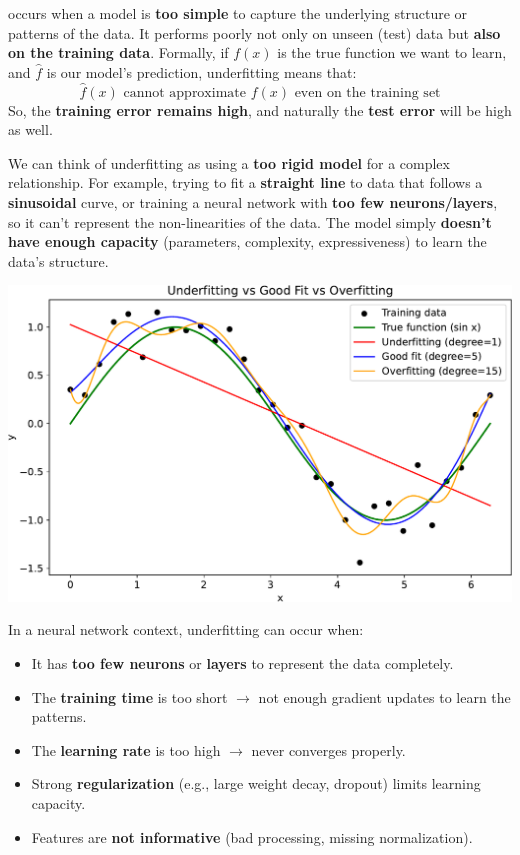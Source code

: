 \begin{remarkbox}
     occurs when a model is \textbf{too simple} to capture the underlying structure or patterns of the data. It performs poorly not only on unseen (test) data but \textbf{also on the training data}. Formally, if $f(x)$ is the true function we want to learn, and $\hat{f}$ is our model's prediction, underfitting means that:
    \begin{equation*}
        \hat{f}(x) \text{ cannot approximate } f(x) \text{ even on the training set}
    \end{equation*}
    So, the \textbf{training error remains high}, and naturally the \textbf{test error} will be high as well.

    \highspace
    We can think of underfitting as using a \textbf{too rigid model} for a complex relationship. For example, trying to fit a \textbf{straight line} to data that follows a \textbf{sinusoidal} curve, or training a neural network with \textbf{too few neurons/layers}, so it can't represent the non-linearities of the data. The model simply \textbf{doesn't have enough capacity} (parameters, complexity, expressiveness) to learn the data's structure.

    \begin{center}
        \includegraphics[width=\textwidth]{img/neural-networks-and-overfitting/underfitting-vs-overfitting.pdf}
    \end{center}

    \highspace
    \textcolor{Red2}{} In a neural network context, underfitting can occur when:
    \begin{itemize}
        \item It has \textbf{too few neurons} or \textbf{layers} to represent the data completely.
        \item The \textbf{training time} is too short $\to$ not enough gradient updates to learn the patterns.
        \item The \textbf{learning rate} is too high $\to$ never converges properly.
        \item Strong \textbf{regularization} (e.g., large weight decay, dropout) limits learning capacity.
        \item Features are \textbf{not informative} (bad processing, missing normalization).
    \end{itemize}
\end{remarkbox}